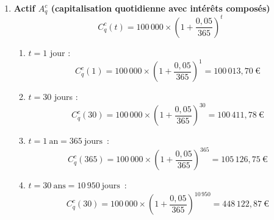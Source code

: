 \documentclass{article}
\begin{document}
            \begin{enumerate}[label=\textbf{R2.\arabic*}]
                \item \textbf{Actif \( A_q^c \) (capitalisation quotidienne avec intérêts composés)}
                    \[
                        C_q^c(t) = 100\,000 \times \left(1 + \frac{0,05}{365}\right)^t
                    \]
                    \begin{enumerate}[label=(\alph*)]
                        \item \( t = 1 \) jour : 
                        \[
                            C_q^c(1) = 100\,000 \times \left(1 + \frac{0,05}{365}\right)^1 = \boxed{100\,013,70\ \text{€}}
                        \]
                        
                        \item $t = 30$ jours : 
                        \[
                            C_q^c(30) = 100\,000 \times \left(1 + \frac{0,05}{365}\right)^{30} = \boxed{100\,411,78\ \text{€}}
                        \]
                        
                        \item $t = 1\ \text{an} = 365\ \text{jours}$~: 
                        \[
                            C_q^c(365) = 100\,000 \times \left(1 + \frac{0,05}{365}\right)^{365} = \boxed{105\,126,75\ \text{€}}
                        \]
                        
                        \item $t = 30\ \text{ans} = 10\,950\ \text{jours}$~: 
                        \[
                            C_q^c(30) = 100\,000 \times \left(1 + \frac{0,05}{365}\right)^{10\,950} = \boxed{448\,122,87\ \text{€}}
                        \]
                    \end{enumerate}
                

\end{enumerate}
\end{document}
